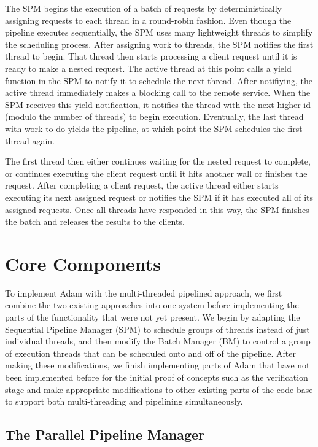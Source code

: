 \documentclass[11pt, oneside]{report}
\begin{document}
The SPM begins the execution of a batch of requests by deterministically assigning requests to each thread in a round-robin fashion.
Even though the pipeline executes sequentially, the SPM uses many lightweight threads to simplify the scheduling process. 
After assigning work to threads, the SPM notifies the first thread to begin. 
That thread then starts processing a client request until it is ready to make a nested request. 
The active thread at this point calls a yield function in the SPM to notify it to schedule the next thread. 
After notifiying, the active thread immediately makes a blocking call to the remote service. 
When the SPM receives this yield notification, it notifies the thread with the next higher id (modulo the number of threads) to begin execution. 
Eventually, the last thread with work to do yields the pipeline, at which point the SPM schedules the first thread again. 

The first thread then either continues waiting for the nested request to complete, or continues executing the client request until it hits another wall or finishes the request. 
After completing a client request, the active thread either starts executing its next assigned request or notifies the SPM if it has executed all of its assigned requests.
Once all threads have responded in this way, the SPM finishes the batch and releases the results to the clients.

\section{Core Components}

To implement Adam with the multi-threaded pipelined approach, we first combine the two existing approaches into one system before implementing the parts of the functionality that were not yet present. 
We begin by adapting the Sequential Pipeline Manager (SPM) to schedule groups of threads instead of just individual threads, and then modify the Batch Manager (BM) to control a group of execution threads that can be scheduled onto and off of the pipeline.
After making these modifications, we finish implementing parts of Adam that have not been implemented before for the initial proof of concepts such as the verification stage and make appropriate modifications to other existing parts of the code base to support both multi-threading and pipelining simultaneously.

\subsection{The Parallel Pipeline Manager}
\end{document}
